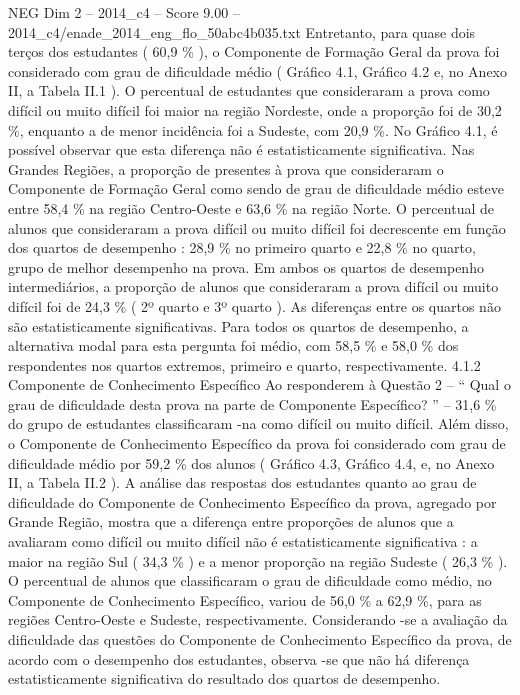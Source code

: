 \begin{textsample}{NEG Dim 2 – 2014\_c4 – Score 9.00 – 2014\_c4/enade\_2014\_eng\_flo\_50abc4b035.txt}
Entretanto, para quase dois terços dos estudantes ( 60,9 \% ), o Componente de Formação Geral da prova foi considerado com grau de dificuldade médio ( Gráfico 4.1, Gráfico 4.2 e, no Anexo II, a Tabela II.1 ).
O percentual de estudantes que consideraram a prova como difícil ou muito difícil foi maior na região Nordeste, onde a proporção foi de 30,2 \%, enquanto a de menor incidência foi a Sudeste, com 20,9 \%.
No Gráfico 4.1, é possível observar que esta diferença não é estatisticamente significativa.
Nas Grandes Regiões, a proporção de presentes à prova que consideraram o Componente de Formação Geral como sendo de grau de dificuldade médio esteve entre 58,4 \% na região Centro-Oeste e 63,6 \% na região Norte.
O percentual de alunos que consideraram a prova difícil ou muito difícil foi decrescente em função dos quartos de desempenho : 28,9 \% no primeiro quarto e 22,8 \% no quarto, grupo de melhor desempenho na prova.
Em ambos os quartos de desempenho intermediários, a proporção de alunos que consideraram a prova difícil ou muito difícil foi de 24,3 \% ( 2º quarto e 3º quarto ).
As diferenças entre os quartos não são estatisticamente significativas.
Para todos os quartos de desempenho, a alternativa modal para esta pergunta foi médio, com 58,5 \% e 58,0 \% dos respondentes nos quartos extremos, primeiro e quarto, respectivamente. 4.1.2 Componente de Conhecimento Específico Ao responderem à Questão 2 – “ Qual o grau de dificuldade desta prova na parte de Componente Específico? ” – 31,6 \% do grupo de estudantes classificaram -na como difícil ou muito difícil.
Além disso, o Componente de Conhecimento Específico da prova foi considerado com grau de dificuldade médio por 59,2 \% dos alunos ( Gráfico 4.3, Gráfico 4.4, e, no Anexo II, a Tabela II.2 ).
A análise das respostas dos estudantes quanto ao grau de dificuldade do Componente de Conhecimento Específico da prova, agregado por Grande Região, mostra que a diferença entre proporções de alunos que a avaliaram como difícil ou muito difícil não é estatisticamente significativa : a maior na região Sul ( 34,3 \% ) e a menor proporção na região Sudeste ( 26,3 \% ).
O percentual de alunos que classificaram o grau de dificuldade como médio, no Componente de Conhecimento Específico, variou de 56,0 \% a 62,9 \%, para as regiões Centro-Oeste e Sudeste, respectivamente.
Considerando -se a avaliação da dificuldade das questões do Componente de Conhecimento Específico da prova, de acordo com o desempenho dos estudantes, observa -se que não há diferença estatisticamente significativa do resultado dos quartos de desempenho.

\end{textsample}
